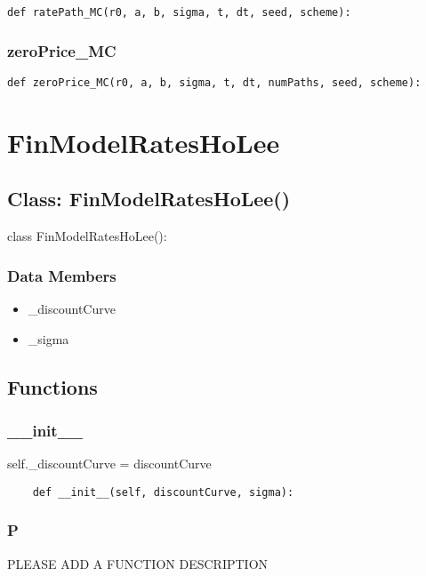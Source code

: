 \documentclass[twoside,11pt]{book}
\begin{document}
\begin{lstlisting}
def ratePath_MC(r0, a, b, sigma, t, dt, seed, scheme):
\end{lstlisting}

\subsubsection*{{\bf zeroPrice\_MC}}


\begin{lstlisting}
def zeroPrice_MC(r0, a, b, sigma, t, dt, numPaths, seed, scheme):
\end{lstlisting}

\newpage
\section{FinModelRatesHoLee}

\subsection*{Class: FinModelRatesHoLee()}
class FinModelRatesHoLee(): 

\subsubsection*{Data Members}
\begin{itemize}
\item{\_discountCurve}
\item{\_sigma}
\end{itemize}

\subsection*{Functions}

\subsubsection*{{\bf \_\_init\_\_}}
self.\_discountCurve = discountCurve 

\begin{lstlisting}
    def __init__(self, discountCurve, sigma):
\end{lstlisting}

\subsubsection*{{\bf P}}
PLEASE ADD A FUNCTION DESCRIPTION
\end{document}
